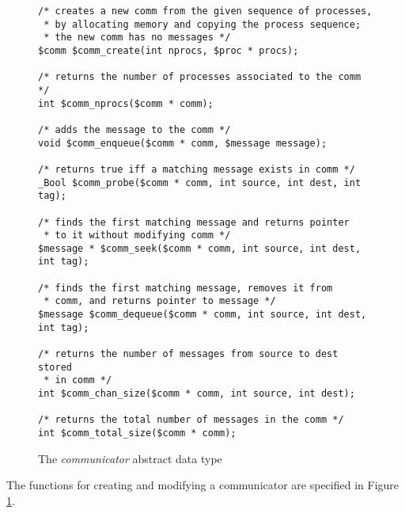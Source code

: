 \begin{figure}
\begin{verbatim}
/* creates a new comm from the given sequence of processes,
 * by allocating memory and copying the process sequence;
 * the new comm has no messages */
$comm $comm_create(int nprocs, $proc * procs);

/* returns the number of processes associated to the comm */ 
int $comm_nprocs($comm * comm);

/* adds the message to the comm */
void $comm_enqueue($comm * comm, $message message);

/* returns true iff a matching message exists in comm */
_Bool $comm_probe($comm * comm, int source, int dest, int tag);

/* finds the first matching message and returns pointer
 * to it without modifying comm */
$message * $comm_seek($comm * comm, int source, int dest, int tag);

/* finds the first matching message, removes it from
 * comm, and returns pointer to message */ 
$message $comm_dequeue($comm * comm, int source, int dest, int tag);

/* returns the number of messages from source to dest stored
 * in comm */ 
int $comm_chan_size($comm * comm, int source, int dest);

/* returns the total number of messages in the comm */ 
int $comm_total_size($comm * comm);
\end{verbatim}
  \caption{The \emph{communicator} abstract data type}
  \label{fig:comm}
\end{figure}

The functions for creating and modifying a communicator are
specified in Figure \ref{fig:comm}.



